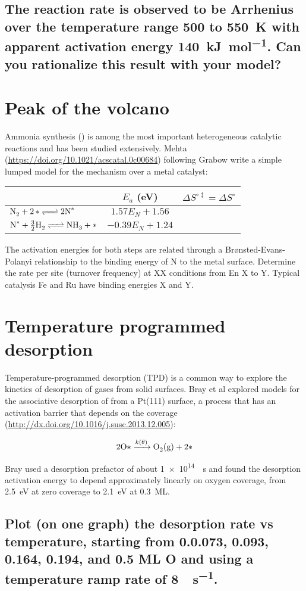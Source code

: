 \documentclass[11pt]{article}
\begin{document}
\subsection{The reaction rate is observed to be Arrhenius over the temperature range 500 to \SI{550}{K} with apparent activation energy \SI{140}{\kilo\joule\per\mole}. Can you rationalize this result with your model?}
\label{sec:orgdc39ce7}

\section{Peak of the volcano}
\label{sec:orga0a7d60}
Ammonia synthesis () is among the most important heterogeneous catalytic reactions and has been studied extensively. Mehta (\url{https://doi.org/10.1021/acscatal.0c00684}) following Grabow write a simple lumped model for the mechanism over a metal catalyst:

\begin{center}
\begin{tabular}{lcc}
\hline
 & \(E_a\) (eV) & \(\Delta S^{\circ\ddagger} = \Delta S^\circ\)\\
\hline
\(\ce{N2 + 2\ast{} <=> 2 N^\ast{} }\) & \(1.57 E_N + 1.56\) & \\
\(\ce{N^\ast{} + 3/2 H2 <=> NH3 + \ast{}}\) & \(-0.39 E_N + 1.24\) & \\
\hline
\end{tabular}
\end{center}

\noindent The activation energies for both steps are related through a Br\o{}nsted-Evans-Polanyi relationship to the binding energy of N to the metal surface. Determine the rate per site (turnover frequency) at XX conditions from En X to Y.  Typical catalysis Fe and Ru have binding energies X and Y.
\section{Temperature programmed desorption}
\label{sec:org63eb7fa}
Temperature-programmed desorption (TPD) is a common way to explore the kinetics of desorption of gases from solid surfaces. Bray et al explored models for the associative desorption of  from a Pt(111) surface, a process that has an activation barrier that depends on the coverage (\url{http://dx.doi.org/10.1016/j.susc.2013.12.005}):

\[ \ce{2 O\ast{} ->[k(\theta)] O2(g) + 2 \ast{}} \]

\noindent Bray used a desorption prefactor of about \SI{1e14}{\per\second} and found the desorption activation energy to depend approximately linearly on oxygen coverage, from \SI{2.5}{eV} at zero coverage to \SI{2.1}{eV} at \SI{0.3}{ML}.  

\subsection{Plot (on one graph) the  desorption rate vs temperature, starting from 0.0.073, 0.093, 0.164, 0.194, and 0.5 ML O and using a temperature ramp rate of \SI{8}{\Kelvin\per\second}.}
\label{sec:org4fa5881}
\end{document}
